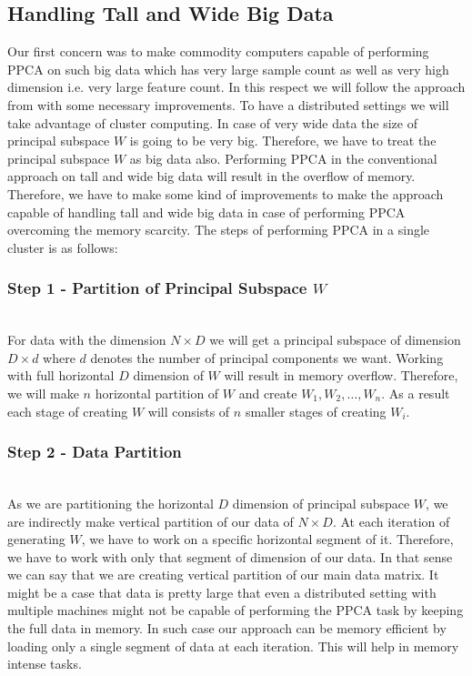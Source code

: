 \documentclass[10pt,conference,letterpaper]{IEEEtran}
\begin{document}
\subsection{Handling Tall and Wide Big Data}
Our first concern was to make commodity computers capable of performing PPCA on such big data which has very large sample count as well as very high dimension i.e. very large feature count. In this respect we will follow the approach from \cite{elgamal} with some necessary improvements. To have a distributed settings we will take advantage of cluster computing. In case of very wide data the size of principal subspace $W$ is going to be very big. Therefore, we have to treat the principal subspace $W$ as big data also. Performing PPCA in the conventional approach on tall and wide big data will result in the overflow of memory. Therefore, we have to make some kind of improvements to make the approach capable of handling tall and wide big data in case of performing PPCA overcoming the memory scarcity. The steps of performing PPCA in a single cluster is as follows:

\subsubsection{\textbf{Step 1 - Partition of Principal Subspace $W$}}\hspace*{\fill} \\
For data with the dimension $N \times D$ we will get a principal subspace of dimension $D \times d$ where $d$ denotes the number of principal components we want. Working with full horizontal $D$ dimension of $W$ will result in memory overflow. Therefore, we will make $n$ horizontal partition of $W$ and create $W_1, W_2, \dots , W_n$. As a result each stage of creating $W$ will consists of $n$ smaller stages of creating $W_i$. 


\subsubsection{\textbf{Step 2 - Data Partition}}\hspace*{\fill} \\
As we are partitioning the horizontal $D$ dimension of principal subspace $W$, we are indirectly make vertical partition of our data of $N \times D$. At each iteration of generating $W$, we have to work on a specific horizontal segment of it. Therefore, we have to work with only that segment of dimension of our data. In that sense we can say that we are creating vertical partition of our main data matrix. It might be a case that data is pretty large that even a distributed setting with multiple machines might not be capable of performing the PPCA task by keeping the full data in memory. In such case our approach can be memory efficient by loading only a single segment of data at each iteration. This will help in memory intense tasks.  
\end{document}
